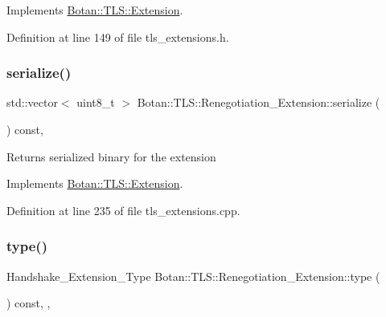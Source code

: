 Implements \mbox{\hyperlink{class_botan_1_1_t_l_s_1_1_extension_aa850b9be2322f94e7c65e583cd51acc5}{Botan\+::\+T\+L\+S\+::\+Extension}}.



Definition at line 149 of file tls\+\_\+extensions.\+h.

\mbox{\label{class_botan_1_1_t_l_s_1_1_renegotiation___extension_ae3c9adc3793b96cd2e1c0801fe0068da}} 
\subsubsection{\texorpdfstring{serialize()}{serialize()}}
{\footnotesize\ttfamily std\+::vector$<$ uint8\+\_\+t $>$ Botan\+::\+T\+L\+S\+::\+Renegotiation\+\_\+\+Extension\+::serialize (\begin{DoxyParamCaption}{ }\end{DoxyParamCaption}) const\hspace{0.3cm}{\ttfamily [override]}, {\ttfamily [virtual]}}

\begin{DoxyReturn}{Returns}
serialized binary for the extension 
\end{DoxyReturn}


Implements \mbox{\hyperlink{class_botan_1_1_t_l_s_1_1_extension_a56788726ad2526db54e5a26039cb69db}{Botan\+::\+T\+L\+S\+::\+Extension}}.



Definition at line 235 of file tls\+\_\+extensions.\+cpp.

\mbox{\label{class_botan_1_1_t_l_s_1_1_renegotiation___extension_a68950eaadf339a1c739e044e9fdff665}} 
\subsubsection{\texorpdfstring{type()}{type()}}
{\footnotesize\ttfamily Handshake\+\_\+\+Extension\+\_\+\+Type Botan\+::\+T\+L\+S\+::\+Renegotiation\+\_\+\+Extension\+::type (\begin{DoxyParamCaption}{ }\end{DoxyParamCaption}) const\hspace{0.3cm}{\ttfamily [inline]}, {\ttfamily [override]}, {\ttfamily [virtual]}}

